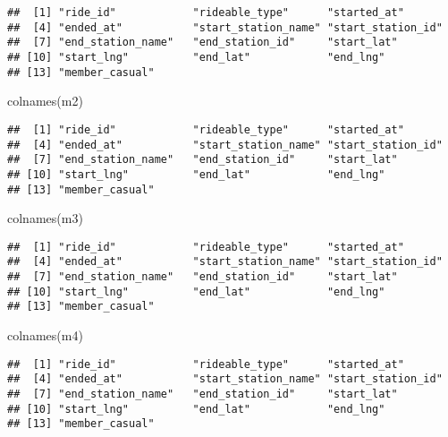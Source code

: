 \documentclass[
]{article}
\newenvironment{Shaded}{\begin{snugshade}}{\end{snugshade}}
\newcommand{\FunctionTok}[1]{\textcolor[rgb]{0.00,0.00,0.00}{#1}}
\newcommand{\NormalTok}[1]{#1}
\begin{document}
\begin{verbatim}
##  [1] "ride_id"            "rideable_type"      "started_at"        
##  [4] "ended_at"           "start_station_name" "start_station_id"  
##  [7] "end_station_name"   "end_station_id"     "start_lat"         
## [10] "start_lng"          "end_lat"            "end_lng"           
## [13] "member_casual"
\end{verbatim}

\begin{Shaded}
\begin{Highlighting}[]
\FunctionTok{colnames}\NormalTok{(m2)}
\end{Highlighting}
\end{Shaded}

\begin{verbatim}
##  [1] "ride_id"            "rideable_type"      "started_at"        
##  [4] "ended_at"           "start_station_name" "start_station_id"  
##  [7] "end_station_name"   "end_station_id"     "start_lat"         
## [10] "start_lng"          "end_lat"            "end_lng"           
## [13] "member_casual"
\end{verbatim}

\begin{Shaded}
\begin{Highlighting}[]
\FunctionTok{colnames}\NormalTok{(m3)}
\end{Highlighting}
\end{Shaded}

\begin{verbatim}
##  [1] "ride_id"            "rideable_type"      "started_at"        
##  [4] "ended_at"           "start_station_name" "start_station_id"  
##  [7] "end_station_name"   "end_station_id"     "start_lat"         
## [10] "start_lng"          "end_lat"            "end_lng"           
## [13] "member_casual"
\end{verbatim}

\begin{Shaded}
\begin{Highlighting}[]
\FunctionTok{colnames}\NormalTok{(m4)}
\end{Highlighting}
\end{Shaded}

\begin{verbatim}
##  [1] "ride_id"            "rideable_type"      "started_at"        
##  [4] "ended_at"           "start_station_name" "start_station_id"  
##  [7] "end_station_name"   "end_station_id"     "start_lat"         
## [10] "start_lng"          "end_lat"            "end_lng"           
## [13] "member_casual"
\end{verbatim}
\end{document}
